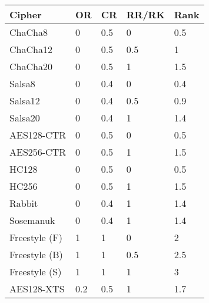 \begin{table}[]
  \begin{tabular}{@{}lllll@{}}
  \toprule
  \textbf{Cipher} & \textbf{OR} & \textbf{CR} & \textbf{RR/RK} & \textbf{Rank} \\ \midrule
  ChaCha8     & 0      & 0.5     & 0       & 0.5      \\
  ChaCha12    & 0      & 0.5     & 0.5      & 1       \\
  ChaCha20    & 0      & 0.5     & 1       & 1.5      \\
  Salsa8     & 0      & 0.4     & 0       & 0.4      \\
  Salsa12     & 0      & 0.4     & 0.5      & 0.9      \\
  Salsa20     & 0      & 0.4     & 1       & 1.4      \\
  AES128-CTR   & 0      & 0.5     & 0       & 0.5      \\
  AES256-CTR   & 0      & 0.5     & 1       & 1.5      \\
  HC128      & 0      & 0.5     & 0       & 0.5      \\
  HC256      & 0      & 0.5     & 1       & 1.5      \\
  Rabbit     & 0      & 0.4     & 1       & 1.4      \\
  Sosemanuk    & 0      & 0.4     & 1       & 1.4      \\
  Freestyle (F)  & 1      & 1      & 0       & 2       \\
  Freestyle (B)  & 1      & 1      & 0.5      & 2.5      \\
  Freestyle (S)  & 1      & 1      & 1       & 3       \\
  AES128-XTS   & 0.2     & 0.5     & 1       & 1.7
  \end{tabular}
  \caption{}
  \label{tbl:security-quant}
\end{table}

